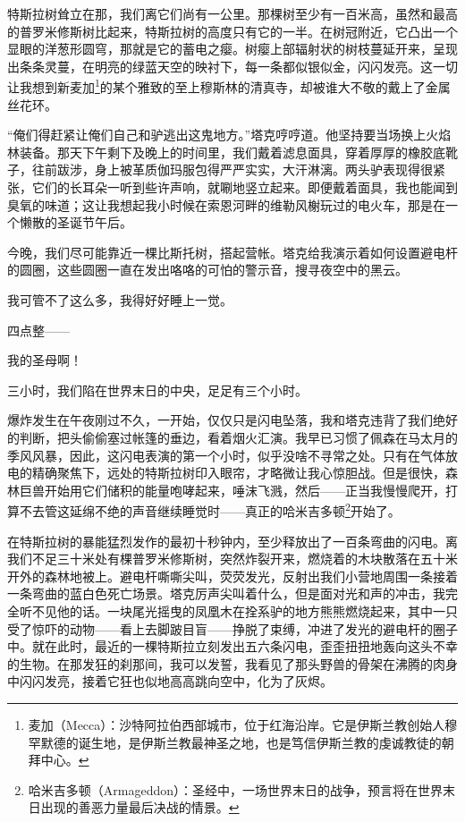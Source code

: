 \documentclass[AutoFakeBold=true]{book}
\begin{document}
特斯拉树耸立在那，我们离它们尚有一公里。那棵树至少有一百米高，虽然和最高的普罗米修斯树比起来，特斯拉树的高度只有它的一半。在树冠附近，它凸出一个显眼的洋葱形圆穹，那就是它的蓄电之瘿。树瘿上部辐射状的树枝蔓延开来，呈现出条条灵蔓，在明亮的绿蓝天空的映衬下，每一条都似银似金，闪闪发亮。这一切让我想到新麦加\footnote{麦加（Mecca）：沙特阿拉伯西部城市，位于红海沿岸。它是伊斯兰教创始人穆罕默德的诞生地，是伊斯兰教最神圣之地，也是笃信伊斯兰教的虔诚教徒的朝拜中心。}的某个雅致的至上穆斯林的清真寺，却被谁大不敬的戴上了金属丝花环。

``俺们得赶紧让俺们自己和驴逃出这鬼地方。''塔克哼哼道。他坚持要当场换上火焰林装备。那天下午剩下及晚上的时间里，我们戴着滤息面具，穿着厚厚的橡胶底靴子，往前跋涉，身上被革质伽玛服包得严严实实，大汗淋漓。两头驴表现得很紧张，它们的长耳朵一听到些许声响，就唰地竖立起来。即便戴着面具，我也能闻到臭氧的味道；这让我想起我小时候在索恩河畔的维勒风榭玩过的电火车，那是在一个懒散的圣诞节午后。

今晚，我们尽可能靠近一棵比斯托树，搭起营帐。塔克给我演示着如何设置避电杆的圆圈，这些圆圈一直在发出咯咯的可怕的警示音，搜寻夜空中的黑云。

我可管不了这么多，我得好好睡上一觉。

\vspace*{1em}{\kaishu 第八十四日}

四点整——

我的圣母啊！

三小时，我们陷在世界末日的中央，足足有三个小时。

爆炸发生在午夜刚过不久，一开始，仅仅只是闪电坠落，我和塔克违背了我们绝好的判断，把头偷偷塞过帐篷的垂边，看着烟火汇演。我早已习惯了佩森在马太月的季风风暴，因此，这闪电表演的第一个小时，似乎没啥不寻常之处。只有在气体放电的精确聚焦下，远处的特斯拉树印入眼帘，才略微让我心惊胆战。但是很快，森林巨兽开始用它们储积的能量咆哮起来，唾沫飞溅，然后——正当我慢慢爬开，打算不去管这延绵不绝的声音继续睡觉时——真正的哈米吉多顿\footnote{哈米吉多顿（Armageddon）：圣经中，一场世界末日的战争，预言将在世界末日出现的善恶力量最后决战的情景。}开始了。

在特斯拉树的暴能猛烈发作的最初十秒钟内，至少释放出了一百条弯曲的闪电。离我们不足三十米处有棵普罗米修斯树，突然炸裂开来，燃烧着的木块散落在五十米开外的森林地被上。避电杆嘶嘶尖叫，荧荧发光，反射出我们小营地周围一条接着一条弯曲的蓝白色死亡场景。塔克厉声尖叫着什么，但是面对光和声的冲击，我完全听不见他的话。一块尾光摇曳的凤凰木在拴系驴的地方熊熊燃烧起来，其中一只受了惊吓的动物——看上去脚跛目盲——挣脱了束缚，冲进了发光的避电杆的圈子中。就在此时，最近的一棵特斯拉立刻发出五六条闪电，歪歪扭扭地轰向这头不幸的生物。在那发狂的刹那间，我可以发誓，我看见了那头野兽的骨架在沸腾的肉身中闪闪发亮，接着它狂也似地高高跳向空中，化为了灰烬。
\end{document}
